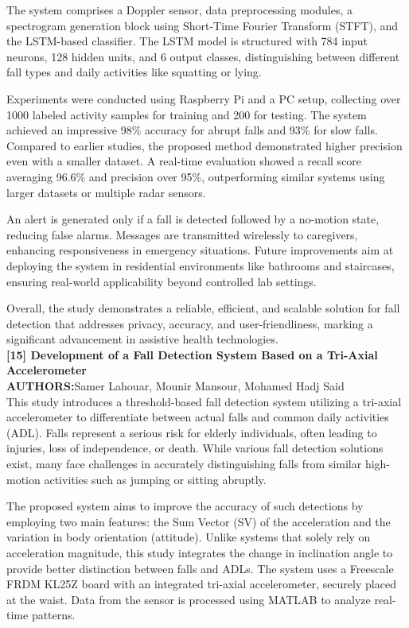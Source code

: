 \documentclass[a4paper, 12pt]{report}
\begin{document}
The system comprises a Doppler sensor, data preprocessing modules, a spectrogram generation block using Short-Time Fourier Transform (STFT), and the LSTM-based classifier. The LSTM model is structured with 784 input neurons, 128 hidden units, and 6 output classes, distinguishing between different fall types and daily activities like squatting or lying.

Experiments were conducted using Raspberry Pi and a PC setup, collecting over 1000 labeled activity samples for training and 200 for testing. The system achieved an impressive 98\% accuracy for abrupt falls and 93\% for slow falls. Compared to earlier studies, the proposed method demonstrated higher precision even with a smaller dataset. A real-time evaluation showed a recall score averaging 96.6\% and precision over 95\%, outperforming similar systems using larger datasets or multiple radar sensors.

An alert is generated only if a fall is detected followed by a no-motion state, reducing false alarms. Messages are transmitted wirelessly to caregivers, enhancing responsiveness in emergency situations. Future improvements aim at deploying the system in residential environments like bathrooms and staircases, ensuring real-world applicability beyond controlled lab settings.

Overall, the study demonstrates a reliable, efficient, and scalable solution for fall detection that addresses privacy, accuracy, and user-friendliness, marking a significant advancement in assistive health technologies.\\

\noindent\textbf{[15] Development of a Fall Detection System Based on a Tri-Axial Accelerometer}\\
\textbf{AUTHORS:}Samer Lahouar, Mounir Mansour, Mohamed Hadj Said\\
This study introduces a threshold-based fall detection system utilizing a tri-axial accelerometer to differentiate between actual falls and common daily activities (ADL). Falls represent a serious risk for elderly individuals, often leading to injuries, loss of independence, or death. While various fall detection solutions exist, many face challenges in accurately distinguishing falls from similar high-motion activities such as jumping or sitting abruptly.

The proposed system aims to improve the accuracy of such detections by employing two main features: the Sum Vector (SV) of the acceleration and the variation in body orientation (attitude). Unlike systems that solely rely on acceleration magnitude, this study integrates the change in inclination angle to provide better distinction between falls and ADLs. The system uses a Freescale FRDM KL25Z board with an integrated tri-axial accelerometer, securely placed at the waist. Data from the sensor is processed using MATLAB to analyze real-time patterns.
\end{document}
